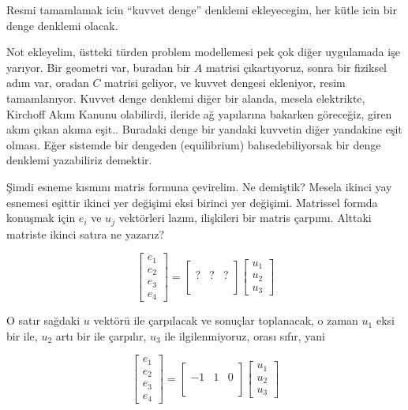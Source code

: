 \documentclass[12pt,fleqn]{article}\usepackage{../../common}
\begin{document}
Resmi tamamlamak icin ``kuvvet denge'' denklemi ekleyecegim, her kütle
icin bir denge denklemi olacak.

Not ekleyelim, üstteki türden problem modellemesi pek çok diğer uygulamada işe
yarıyor. Bir geometri var, buradan bir $A$ matrisi çıkartıyoruz, sonra bir
fiziksel adım var, oradan $C$ matrisi geliyor, ve kuvvet dengesi ekleniyor,
resim tamamlanıyor. Kuvvet denge denklemi diğer bir alanda, mesela elektrikte,
Kirchoff Akım Kanunu olabilirdi, ileride ağ yapılarına bakarken göreceğiz, giren
akım çıkan akıma eşit.. Buradaki denge bir yandaki kuvvetin diğer yandakine eşit
olması. Eğer sistemde bir dengeden (equilibrium) bahsedebiliyorsak bir denge
denklemi yazabiliriz demektir.

Şimdi esneme kısmını matris formuna çevirelim. Ne demiştik? Mesela ikinci yay
esnemesi eşittir ikinci yer değişimi eksi birinci yer değişimi. Matrissel formda
konuşmak için $e_i$ ve $u_j$ vektörleri lazım, ilişkileri bir matris çarpımı.
Alttaki matriste ikinci satıra ne yazarız?

$$
\left[\begin{array}{c}
e_1 \\ e_2 \\ e_3 \\ e_4
\end{array}\right] =
\left[\begin{array}{cccc}
 & & \\ ? & ? & ? \\  & & \\  & & 
\end{array}\right]
\left[\begin{array}{c}
u_1 \\ u_2 \\ u_3 
\end{array}\right]
$$

O satır sağdaki $u$ vektörü ile çarpılacak ve sonuçlar toplanacak, o zaman $u_1$
eksi bir ile, $u_2$ artı bir ile çarpılır, $u_3$ ile ilgilenmiyoruz, orası
sıfır, yani

$$
\left[\begin{array}{c}
e_1 \\ e_2 \\ e_3 \\ e_4
\end{array}\right] =
\left[\begin{array}{cccc}
 & & \\ -1 & 1 & 0 \\  & & \\  & & 
\end{array}\right]
\left[\begin{array}{c}
u_1 \\ u_2 \\ u_3 
\end{array}\right]
$$
\end{document}
